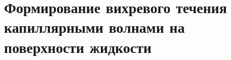
%

\chapter{Формирование вихревого течения капиллярными волнами на поверхности жидкости} \label{chapt3}

